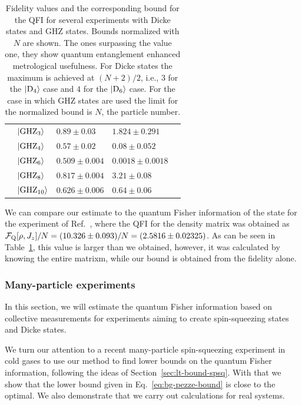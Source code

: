 \begin{table}
\begin{center}
\begin{tabular}{| l | l | l | l | l |}
      & $\vert{\textnormal{GHZ}_{3}}\rangle$  & $0.89\pm0.03$   & $1.824\pm0.291$ & \cite{Leibfried2004} \\
      & $\vert{\textnormal{GHZ}_{4}}\rangle$  & $0.57\pm0.02$   & $0.08\pm0.052$  & \cite{Sackett2000}\\
      & $\vert{\textnormal{GHZ}_{6}}\rangle$  & $0.509\pm0.004$ & $0.0018\pm0.0018$ & \cite{Leibfried2005} \\
      & $\vert{\textnormal{GHZ}_{8}}\rangle$  & $0.817\pm0.004$ & $3.21\pm0.08$ & \cite{Monz2011} \\
      & $\vert{\textnormal{GHZ}_{10}}\rangle$ & $0.626\pm0.006$ & $0.64\pm0.06$ & \cite{Monz2011} \\ \hline
    \end{tabular}
  \end{center}
  \caption[Bounds on QFI for experimental data when fidelities are measured]{Fidelity values and the corresponding bound for the QFI for several experiments with Dicke states and GHZ states.
  Bounds normalized with $N$ are shown.
  The ones surpassing the value one, they show quantum entanglement enhanced metrological usefulness.
  For Dicke states the maximum is achieved at $(N+2)/2$, i.e., $3$ for the $\vert{\ensuremath{\textnormal{D}_{4}}}\rangle$ case and $4$ for the $\vert{\ensuremath{\textnormal{D}_{6}}}\rangle$ case.
  For the case in which GHZ states are used the limit for the normalized bound is $N$, the particle number.}
  \label{tab:lt-results-for-fidelities}
\end{table}

We can compare our estimate to the quantum Fisher information of the state for the experiment of Ref.~\cite{Krischek2011}, where the QFI for the density matrix was obtained as $\mathcal{F}_{\textnormal{Q}}[{\textstyle \rho,J_z}]/N=(10.326\pm0.093)/N=(2.5816\pm0.02325)$.
As can be seen in Table~\ref{tab:lt-results-for-fidelities}, this value is larger than we obtained, however, it was calculated by knowing the entire matrixm, while our bound is obtained from the fidelity alone.

\subsubsection{Many-particle experiments}
\label{sec:lt-many-particle-experiments}

In this section, we will estimate the quantum Fisher information based on collective measurements for experiments aiming to create spin-squeezing states and Dicke states.


We turn our attention to a recent many-particle spin-squeezing experiment in cold gases to use our method to find lower bounds on the quantum Fisher information, following the ideas of Section~\ref{sec:lt-bound-spsq}.
With that we show that the lower bound given in Eq.~\eqref{eq:bg-pezze-bound} is close to the optimal.
We also demonstrate that we carry out calculations for real systems.

